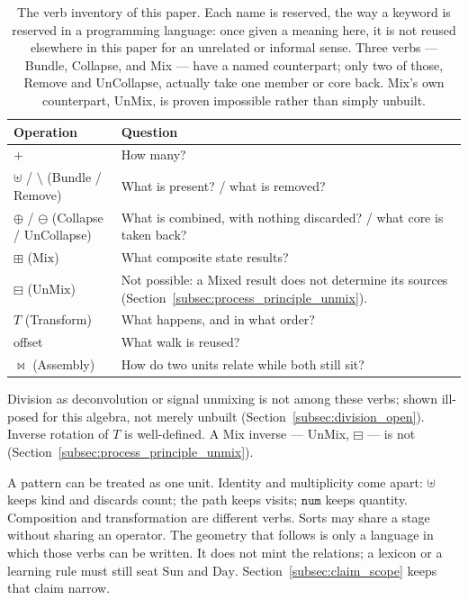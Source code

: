 \documentclass[12pt, a4paper]{article}
\begin{document}
\begin{table}[h]
\centering
\begin{tabular}{lp{7.2cm}}
\hline
Operation & Question \\
\hline
$+$ & How many? \\
$\uplus$ / $\setminus$ (Bundle / Remove) & What is present? / what is removed? \\
$\oplus$ / $\ominus$ (Collapse / UnCollapse) & What is combined, with nothing discarded? / what core is taken back? \\
$\boxplus$ ($\mathrm{Mix}$) & What composite state results? \\
$\boxminus$ ($\mathrm{UnMix}$) & Not possible: a Mixed result does not determine its sources (Section~\ref{subsec:process_principle_unmix}). \\
$T$ (Transform) & What happens, and in what order? \\
offset & What walk is reused? \\
$\bowtie$ (Assembly) & How do two units relate while both still sit? \\
\hline
\end{tabular}
\caption{The verb inventory of this paper. Each name is reserved,
the way a keyword is reserved in a programming language: once given
a meaning here, it is not reused elsewhere in this paper for an
unrelated or informal sense. Three verbs --- Bundle, Collapse, and
Mix --- have a named counterpart; only two of those, Remove and
UnCollapse, actually take one member or core back. Mix's own
counterpart, UnMix, is proven impossible rather than simply
unbuilt.}
\label{tab:verb_inventory}
\end{table}

Division as deconvolution or signal unmixing is not among these
verbs; shown ill-posed for this algebra, not merely unbuilt
(Section~\ref{subsec:division_open}).
Inverse rotation of $T$ is well-defined. A Mix inverse ---
UnMix, $\boxminus$ --- is not
(Section~\ref{subsec:process_principle_unmix}).

A pattern can be treated as one unit. Identity and multiplicity come
apart: $\uplus$ keeps kind and discards count; the path keeps visits;
$\mathtt{num}$ keeps quantity. Composition and transformation are
different verbs. Sorts may share a stage without sharing an operator.
The geometry that follows is only a language in which those verbs can
be written. It does not mint the relations; a lexicon or a learning
rule must still seat $\mathrm{Sun}$ and $\mathrm{Day}$.
Section~\ref{subsec:claim_scope} keeps that claim narrow.
\end{document}
